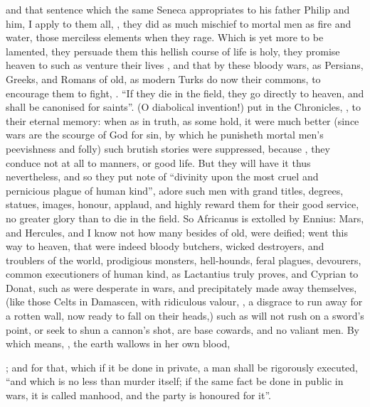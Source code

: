 and that sentence which the same Seneca appropriates to his
father Philip and him, I apply to them all, , \etc{} they did as much
mischief to mortal men as fire and water, those merciless elements when they
rage. Which is yet more to be lamented, they persuade them
this hellish course of life is holy, they promise heaven to such as venture
their lives , and that by these bloody wars, as Persians,
Greeks, and Romans of old, as modern Turks do now their commons, to encourage
them to fight, . \enquote{If they die in the field, they go
directly to heaven, and shall be canonised for saints}. (O diabolical
invention!) put in the Chronicles, , to their
eternal memory: when as in truth, as some hold, it were
much better (since wars are the scourge of God for sin, by which he punisheth
mortal men's peevishness and folly) such brutish stories were suppressed,
because , they conduce not at all to
manners, or good life. But they will have it thus nevertheless, and so they put
note of \enquote{divinity upon the most cruel and pernicious plague
of human kind}, adore such men with grand titles, degrees, statues, images,
honour, applaud, and highly reward them for their good
service, no greater glory than to die in the field. So Africanus is extolled by
Ennius: Mars, and Hercules, and I know not how many besides
of old, were deified; went this way to heaven, that were indeed bloody
butchers, wicked destroyers, and troublers of the world, prodigious monsters,
hell-hounds, feral plagues, devourers, common executioners of human kind, as
Lactantius truly proves, and Cyprian to Donat, such as were desperate in wars,
and precipitately made away themselves, (like those Celts in Damascen, with
ridiculous valour, , a
disgrace to run away for a rotten wall, now ready to fall on their heads,) such
as will not rush on a sword's point, or seek to shun a cannon's shot, are base
cowards, and no valiant men. By which means, ,
the earth wallows in her own blood,

; and for
that, which if it be done in private, a man shall be rigorously executed,
\enquote{and which is no less than murder itself; if the same fact
be done in public in wars, it is called manhood, and the party is honoured for
it}.

